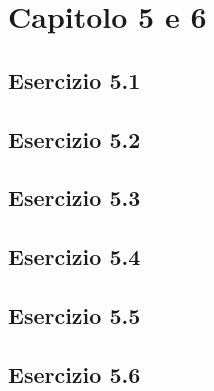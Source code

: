 \section{Capitolo 5 e 6}
\subsection{Esercizio 5.1}

\subsection{Esercizio 5.2}

\subsection{Esercizio 5.3}

\subsection{Esercizio 5.4}

\subsection{Esercizio 5.5}

\subsection{Esercizio 5.6}

